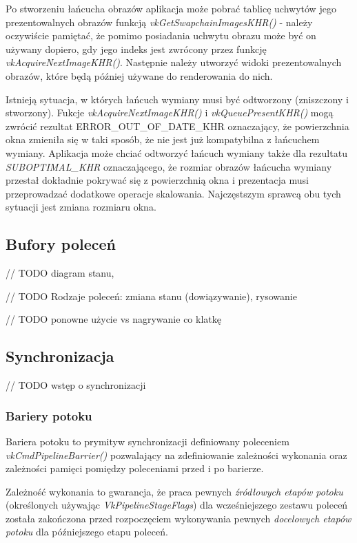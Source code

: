 Po stworzeniu łańcucha obrazów aplikacja może pobrać tablicę uchwytów jego prezentowalnych obrazów funkcją \textit{vkGetSwapchainImagesKHR()} - należy oczywiście pamiętać, że pomimo posiadania uchwytu obrazu może być on używany dopiero, gdy jego indeks jest zwrócony przez funkcję \textit{vkAcquireNextImageKHR()}.
Następnie należy utworzyć widoki prezentowalnych obrazów, które będą później używane do renderowania do nich.

Istnieją sytuacja, w których łańcuch wymiany musi być odtworzony (zniszczony i stworzony).
Fukcje \textit{vkAcquireNextImageKHR()} i \textit{vkQueuePresentKHR()} mogą zwrócić rezultat
ERROR\_OUT\_OF\_DATE\_KHR oznaczający, że powierzchnia okna zmieniła się w taki sposób, że nie jest już kompatybilna z łańcuchem wymiany.
Aplikacja może chciać odtworzyć łańcuch wymiany także dla rezultatu \textit{SUBOPTIMAL\_KHR} oznaczającego, że rozmiar obrazów łańcucha wymiany przestał dokładnie pokrywać się z powierzchnią okna i prezentacja musi przeprowadzać dodatkowe operacje skalowania.
Najczęstszym sprawcą obu tych sytuacji jest zmiana rozmiaru okna.


\subsection{Bufory poleceń}

// TODO diagram stanu,

// TODO Rodzaje poleceń: zmiana stanu (dowiązywanie), rysowanie

// TODO ponowne użycie vs nagrywanie co klatkę

\subsection{Synchronizacja}

// TODO wstęp o synchronizacji

\subsubsection{Bariery potoku}

Bariera potoku to prymityw synchronizacji definiowany poleceniem \textit{vkCmdPipelineBarrier()} pozwalający na zdefiniowanie zależności wykonania oraz zależności pamięci pomiędzy poleceniami przed i po barierze.

Zależność wykonania to gwarancja, że praca pewnych \textit{źródłowych etapów potoku} (określonych używając
\textit{VkPipelineStageFlags}) dla wcześniejszego zestawu poleceń została zakończona przed rozpoczęciem wykonywania pewnych
\textit{docelowych etapów potoku} dla późniejszego etapu poleceń. 

